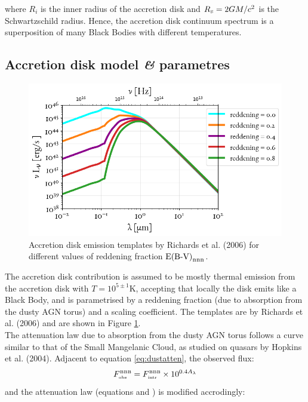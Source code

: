 where $R_i$ is the inner radius of the accretion disk and $R_{\mbox{\tiny{S}}} = 2GM/c^2$ is the Schwartzschild radius. Hence, the accretion disk continuum spectrum is a superposition of many Black Bodies with different temperatures. 
\subsection{Accretion disk model \textit{\&} parametres}
\begin{figure}
  \includegraphics[width = \textwidth]{figures/Templates/BBB_T.png}
 \caption{Accretion disk emission templates by Richards et al. (2006)\cite{Richards2006} for different values of reddening fraction $\mbox{E(B-V)}_{\mbox{\tiny{BBB}}}$. }
  \label{fig:BBB_temp}
\end{figure}
The accretion disk contribution is assumed to be mostly thermal emission from the accretion disk with $T=10^{5 \pm 1} $K, accepting that locally the disk emits like a Black Body, and is parametrised by a reddening fraction (due to absorption from the dusty AGN torus) and a scaling coefficient\cite{Richards2006}. 
The templates are by Richards et al. (2006)\cite{Richards2006} and are shown in Figure \ref{fig:BBB_temp}.\\
The attenuation law due to absorption from the dusty AGN torus follows a curve similar to that of the Small Mangelanic Cloud, as studied on quasars by Hopkins et al. (2004)\cite{Hopkins2004}. Adjacent to equation \ref{eq:dustatten}, the observed flux:
\begin{equation}
     F_{\mbox{\tiny{obs}}}^{\mbox{\tiny{BBB}}}= F_{\mbox{\tiny{intr}}}^{\mbox{\tiny{BBB}}} \times 10^{0.4 A_{\lambda}} 
\end{equation}
and the attenuation law (equations \label{eq:dustatten2} and \label{eq:dustatten3}) is modified accrodingly\cite{Prevot1984}:
